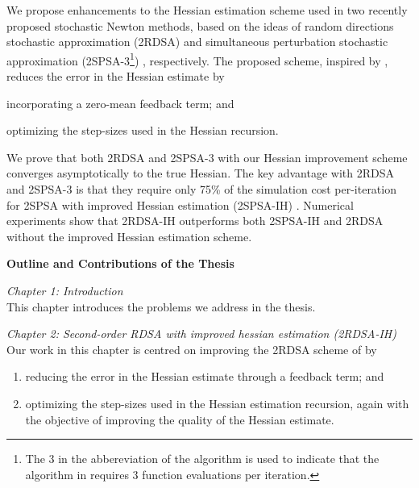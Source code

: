 \documentclass[12pt]{article}
\begin{document}
We propose enhancements to the Hessian estimation scheme used in two recently proposed stochastic Newton methods, based on the ideas of random directions stochastic approximation (2RDSA) \cite{prashanth2015rdsa} and simultaneous perturbation stochastic approximation (2SPSA-3\footnote{The 3 in the abbereviation of the algorithm is used to indicate that the algorithm in \cite{bhatnagar2015simultaneous} requires 3 function evaluations per iteration.}) \cite{bhatnagar2015simultaneous}, respectively. The proposed scheme, inspired by \cite{spall-jacobian}, reduces the error in the Hessian estimate by 
\begin{inparaenum}[\bfseries (i)]
	\item incorporating a zero-mean feedback term; and
	\item optimizing the step-sizes used in the Hessian recursion.
\end{inparaenum}
We prove that both 2RDSA and 2SPSA-3 with our Hessian improvement scheme converges asymptotically to the true Hessian.
The key advantage with 2RDSA and 2SPSA-3  is that they require only 75\% of the simulation cost per-iteration for 2SPSA with improved Hessian estimation (2SPSA-IH) \cite{spall-jacobian}.
Numerical experiments show that 2RDSA-IH outperforms both 2SPSA-IH and 2RDSA without the improved Hessian estimation scheme.



\vspace{1cm}

\begin{center}

\textbf{\large{Outline and Contributions of the Thesis}}
\end{center}




\textit{Chapter 1: Introduction} \\

This chapter introduces the problems we address in the thesis.
\vspace{0.5cm}


\textit{Chapter 2: Second-order RDSA with improved hessian estimation (2RDSA-IH) } \\


Our work in this chapter  is centred on improving the 2RDSA scheme of \cite{prashanth2015rdsa} by 
\begin{enumerate}
\item reducing the error in the Hessian estimate through a feedback term; and
\item optimizing the step-sizes used in the Hessian estimation recursion, again with the objective of improving the quality of the Hessian estimate.
\end{enumerate}
\end{document}
